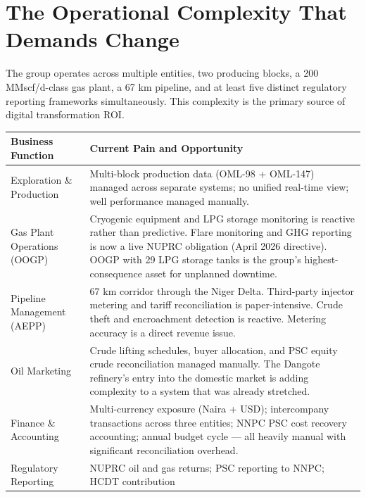 \documentclass[10pt]{article}
\begin{document}
\vspace{10pt}

\section{The Operational Complexity That Demands Change}

{\small
The group operates across multiple entities, two producing blocks, a 200 MMscf/d-class
gas plant, a 67 km pipeline, and at least five distinct regulatory reporting frameworks
simultaneously. This complexity is the primary source of digital transformation ROI.
}

\vspace{4pt}
\small
\begin{tabularx}{\columnwidth}{@{}lX@{}}
\toprule
\textbf{Business Function} & \textbf{Current Pain and Opportunity} \\
\midrule
Exploration \& Production
  & Multi-block production data (OML-98 + OML-147) managed across separate
    systems; no unified real-time view; well performance managed manually. \\[4pt]
Gas Plant Operations (OOGP)
  & Cryogenic equipment and LPG storage monitoring is reactive rather than
    predictive. Flare monitoring and GHG reporting is now a live NUPRC
    obligation (April 2026 directive). OOGP with 29 LPG storage tanks is the
    group's highest-consequence asset for unplanned downtime. \\[4pt]
Pipeline Management (AEPP)
  & 67 km corridor through the Niger Delta. Third-party injector metering and
    tariff reconciliation is paper-intensive. Crude theft and encroachment
    detection is reactive. Metering accuracy is a direct revenue issue. \\[4pt]
Oil Marketing
  & Crude lifting schedules, buyer allocation, and PSC equity crude
    reconciliation managed manually. The Dangote refinery's entry into the
    domestic market is adding complexity to a system that was already stretched. \\[4pt]
Finance \& Accounting
  & Multi-currency exposure (Naira + USD); intercompany transactions across
    three entities; NNPC PSC cost recovery accounting; annual budget cycle ---
    all heavily manual with significant reconciliation overhead. \\[4pt]
Regulatory Reporting
  & NUPRC oil and gas returns; PSC reporting to NNPC; HCDT contribution

\end{tabularx}
\end{document}
